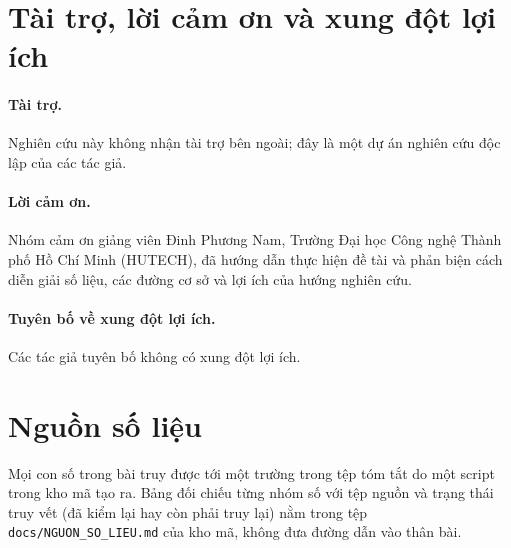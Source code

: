 \documentclass[12pt,a4paper]{article}
\begin{document}
\section*{Tài trợ, lời cảm ơn và xung đột lợi ích}
\paragraph{Tài trợ.} Nghiên cứu này không nhận tài trợ bên ngoài; đây là một dự án nghiên cứu độc lập của các tác giả.
\paragraph{Lời cảm ơn.} Nhóm cảm ơn giảng viên Đinh Phương Nam, Trường Đại học Công nghệ Thành phố Hồ Chí Minh (HUTECH), đã hướng dẫn thực hiện đề tài và phản biện cách diễn giải số liệu, các đường cơ sở và lợi ích của hướng nghiên cứu.
\paragraph{Tuyên bố về xung đột lợi ích.} Các tác giả tuyên bố không có xung đột lợi ích.

\appendix
\section{Nguồn số liệu}
\label{app:src}
Mọi con số trong bài truy được tới một trường trong tệp tóm tắt do một script trong kho mã tạo ra. Bảng đối chiếu từng nhóm số với tệp nguồn và trạng thái truy vết (đã kiểm lại hay còn phải truy lại) nằm trong tệp \texttt{docs/NGUON\_SO\_LIEU.md} của kho mã, không đưa đường dẫn vào thân bài.



\end{document}
